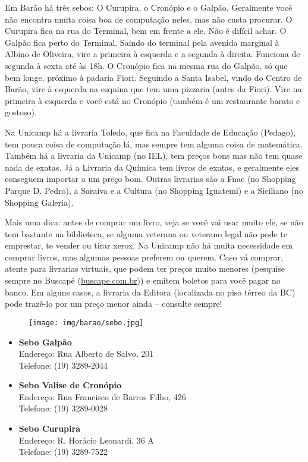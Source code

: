 Em Barão há três sebos: O Curupira, o Cronópio e o Galpão. Geralmente você não
encontra muita coisa boa de computação neles, mas não custa procurar. O
Curupira fica na rua do Terminal, bem em frente a ele. Não é difícil achar. O
Galpão fica perto do Terminal. Saindo do terminal pela avenida marginal à
Albino de Oliveira, vire a primeira à esquerda e a segunda à direita. Funciona
de segunda à sexta até às 18h. O Cronópio fica na mesma rua do Galpão, só que
bem longe, próximo à padaria Fiori. Seguindo a Santa Isabel, vindo do Centro de
Barão, vire à esquerda na esquina que tem uma pizzaria (antes da Fiori). Vire
na primeira à esquerda e você está no Cronópio (também é um restaurante barato
e gostoso).

Na Unicamp há a livraria Toledo, que fica na Faculdade de Educação (Pedago),
tem pouca coisa de computação lá, mas sempre tem alguma coisa de matemática.
Também há a livraria da Unicamp (no IEL), tem preços bons mas não tem quase
nada de exatas. Já a Livraria da Química tem livros de exatas, e geralmente
eles conseguem importar a um preço bom. Outras livrarias são a Fnac (no
Shopping Parque D. Pedro), a Saraiva e a Cultura (no Shopping Iguatemi) e a
Siciliano (no Shopping Galeria).

Mais uma dica: antes de comprar um livro, veja se você vai usar muito ele, se
não tem bastante na biblioteca, se alguma veterana ou veterano legal não pode
te emprestar, te vender ou tirar xerox. Na Unicamp não há muita necessidade em
comprar livros, mas algumas pessoas preferem ou querem. Caso vá comprar, atente
para livrarias virtuais, que podem ter preços muito menores (pesquise sempre no
Buscapé (\url{buscape.com.br})) e emitem boletos para você pagar no banco. Em
alguns casos, a livraria da Editora (localizada no piso térreo da BC) pode
trazê-lo por um preço menor ainda -- consulte sempre!

\begin{figure}[h!]
    \centering
    \texttt{[image: img/barao/sebo.jpg]}
\end{figure}

\begin{itemize}
\item \textbf{Sebo Galpão}
  \\Endereço: Rua Alberto de Salvo, 201
  \\Telefone: (19) 3289-2044

\item \textbf{Sebo Valise de Cronópio}
  \\Endereço: Rua Francisco de Barros Filho, 426
  \\Telefone: (19) 3289-0028

\item \textbf{Sebo Curupira}
  \\Endereço: R. Horácio Leonardi, 36 A
  \\Telefone: (19) 3289-7522
\end{itemize}

